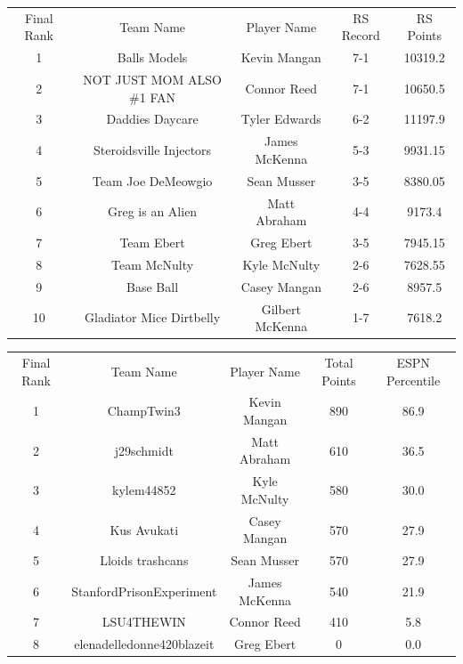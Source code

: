 \documentclass[11pt,letterpaper]{article}
\begin{document}
\newpage
{}
\vspace{-25pt}
\begin{table} [h]
\begin{center}
\begin{tabular} { c c c c c }
\\ Final Rank & Team Name & Player Name & RS Record & RS Points
\\ 1  & Balls Models & Kevin Mangan & 7-1 & 10319.2
\\ 2  & NOT JUST MOM ALSO \#1 FAN & Connor Reed & 7-1 & 10650.5
\\ 3  & Daddies Daycare & Tyler Edwards & 6-2 & 11197.9
\\ 4  & Steroidsville Injectors & James McKenna & 5-3 & 9931.15
\\ 5  & Team Joe DeMeowgio & Sean Musser & 3-5 & 8380.05
\\ 6  & Greg is an Alien & Matt Abraham & 4-4 & 9173.4
\\ 7  & Team Ebert & Greg Ebert & 3-5 & 7945.15
\\ 8  & Team McNulty & Kyle McNulty & 2-6 & 7628.55
\\ 9  & Base Ball & Casey Mangan & 2-6 & 8957.5
\\ 10  & Gladiator Mice Dirtbelly & Gilbert McKenna & 1-7 & 7618.2
\end{tabular}
\end{center}
\end{table}


\newpage
{}
\vspace{-25pt}
\begin{table} [h]
\begin{center}
\begin{tabular} { c c c c c }
\\ Final Rank & Team Name & Player Name & Total Points & ESPN Percentile
\\ 1  & ChampTwin3 & Kevin Mangan & 890 & 86.9
\\ 2 & j29schmidt & Matt Abraham & 610 & 36.5
\\ 3 & kylem44852 & Kyle McNulty & 580 & 30.0
\\ 4 & Kus Avukati & Casey Mangan & 570 & 27.9
\\ 5 & Lloids trashcans & Sean Musser & 570 & 27.9
\\ 6 & StanfordPrisonExperiment & James McKenna & 540 & 21.9
\\ 7 & LSU4THEWIN & Connor Reed & 410 & 5.8
\\ 8 & elenadelledonne420blazeit & Greg Ebert & 0 & 0.0
\end{tabular}
\end{center}
\end{table}
\end{document}
